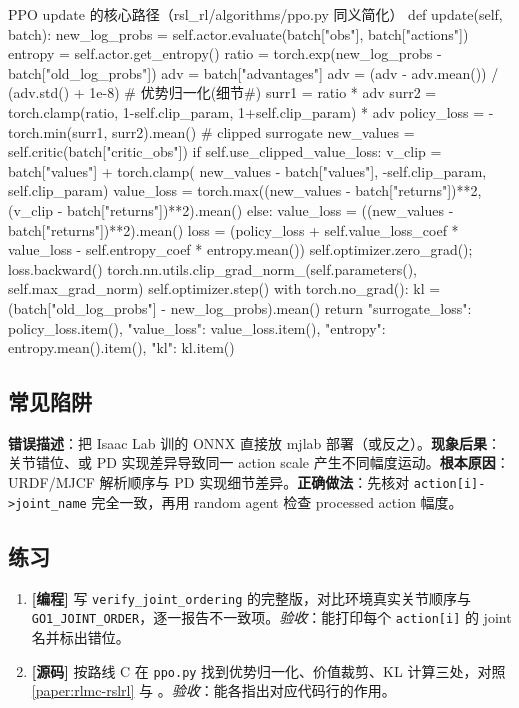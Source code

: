\begin{codebox}[Python]{PPO update 的核心路径（rsl\_rl/algorithms/ppo.py 同义简化）}
def update(self, batch):
    new_log_probs = self.actor.evaluate(batch["obs"], batch["actions"])
    entropy = self.actor.get_entropy()
    ratio = torch.exp(new_log_probs - batch["old_log_probs"])
    adv = batch["advantages"]
    adv = (adv - adv.mean()) / (adv.std() + 1e-8)         # 优势归一化(细节#)
    surr1 = ratio * adv
    surr2 = torch.clamp(ratio, 1-self.clip_param, 1+self.clip_param) * adv
    policy_loss = -torch.min(surr1, surr2).mean()         # clipped surrogate
    new_values = self.critic(batch["critic_obs"])
    if self.use_clipped_value_loss:
        v_clip = batch["values"] + torch.clamp(
            new_values - batch["values"], -self.clip_param, self.clip_param)
        value_loss = torch.max((new_values - batch["returns"])**2,
                               (v_clip - batch["returns"])**2).mean()
    else:
        value_loss = ((new_values - batch["returns"])**2).mean()
    loss = (policy_loss + self.value_loss_coef * value_loss
            - self.entropy_coef * entropy.mean())
    self.optimizer.zero_grad(); loss.backward()
    torch.nn.utils.clip_grad_norm_(self.parameters(), self.max_grad_norm)
    self.optimizer.step()
    with torch.no_grad():
        kl = (batch["old_log_probs"] - new_log_probs).mean()
    return {"surrogate_loss": policy_loss.item(), "value_loss": value_loss.item(),
            "entropy": entropy.mean().item(), "kl": kl.item()}
\end{codebox}

\subsection{常见陷阱}

\begin{pitfall}
\textbf{错误描述}：把 Isaac Lab 训的 ONNX 直接放 mjlab 部署（或反之）。\textbf{现象后果}：关节错位、或 PD 实现差异导致同一 action scale 产生不同幅度运动。\textbf{根本原因}：URDF/MJCF 解析顺序与 PD 实现细节差异。\textbf{正确做法}：先核对 \verb|action[i]->joint_name| 完全一致，再用 random agent 检查 processed action 幅度。
\end{pitfall}

\subsection{练习}

\begin{practice}[部署核对与源码]
\begin{enumerate}
  \item \textbf{[编程]} 写 \verb|verify_joint_ordering| 的完整版，对比环境真实关节顺序与 \verb|GO1_JOINT_ORDER|，逐一报告不一致项。\emph{验收}：能打印每个 \verb|action[i]| 的 joint 名并标出错位。
  \item \textbf{[源码]} 按路线 C 在 \verb|ppo.py| 找到优势归一化、价值裁剪、KL 计算三处，对照 \cref{paper:rlmc-rslrl} 与 \cite{huang2022ppo37}。\emph{验收}：能各指出对应代码行的作用。
\end{enumerate}
\end{practice}

